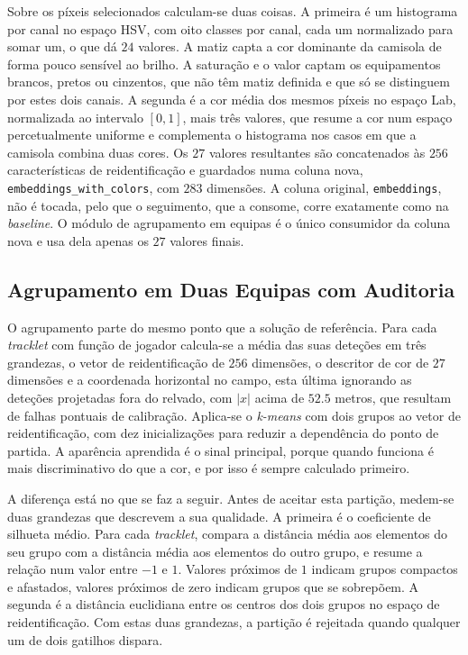 Sobre os píxeis selecionados calculam-se duas coisas. A primeira é um histograma por canal no
espaço HSV, com oito classes por canal, cada um normalizado para somar um, o que dá $24$ valores.
A matiz capta a cor dominante da camisola de forma pouco sensível ao brilho. A saturação e o valor
captam os equipamentos brancos, pretos ou cinzentos, que não têm matiz definida e que só se
distinguem por estes dois canais. A segunda é a cor média dos mesmos píxeis no espaço Lab,
normalizada ao intervalo $[0,1]$, mais três valores, que resume a cor num espaço percetualmente
uniforme e complementa o histograma nos casos em que a camisola combina duas cores. Os $27$ valores
resultantes são concatenados às $256$ características de reidentificação e guardados numa coluna
nova, \texttt{embeddings\_with\_colors}, com $283$ dimensões. A coluna original,
\texttt{embeddings}, não é tocada, pelo que o seguimento, que a consome, corre exatamente como na
\emph{baseline}. O módulo de agrupamento em equipas é o único consumidor da coluna nova e usa dela apenas os $27$
valores finais.

\subsection{Agrupamento em Duas Equipas com Auditoria}\label{sec:agrupamento}

O agrupamento parte do mesmo ponto que a solução de referência. Para cada \emph{tracklet} com
função de jogador calcula-se a média das suas deteções em três grandezas, o vetor de
reidentificação de $256$ dimensões, o descritor de cor de $27$ dimensões e a coordenada
horizontal no campo, esta última ignorando as deteções projetadas fora do relvado, com $|x|$ acima
de $52.5$ metros, que resultam de falhas pontuais de calibração. Aplica-se o \emph{k-means} com
dois grupos ao vetor de reidentificação, com dez inicializações para reduzir a dependência do
ponto de partida. A aparência aprendida é o sinal principal, porque quando funciona é mais
discriminativo do que a cor, e por isso é sempre calculado primeiro.

A diferença está no que se faz a seguir. Antes de aceitar esta partição, medem-se duas grandezas
que descrevem a sua qualidade. A primeira é o coeficiente de silhueta médio. Para cada
\emph{tracklet}, compara a distância média aos elementos do seu grupo com a distância média aos
elementos do outro grupo, e resume a relação num valor entre $-1$ e $1$. Valores próximos de $1$
indicam grupos compactos e afastados, valores próximos de zero indicam grupos que se sobrepõem. A
segunda é a distância euclidiana entre os centros dos dois grupos no espaço de reidentificação.
Com estas duas grandezas, a partição é rejeitada quando qualquer um de dois gatilhos dispara.

